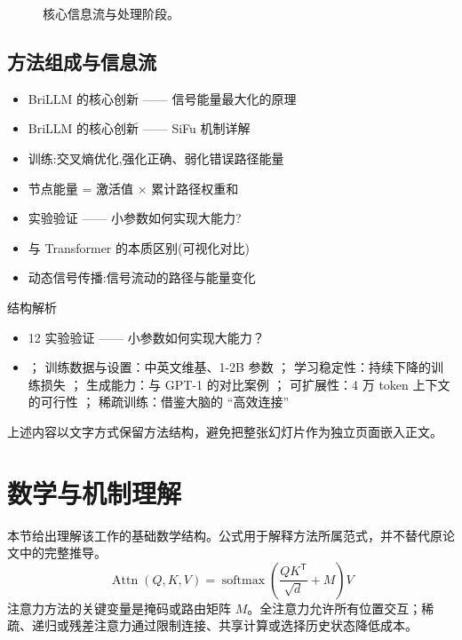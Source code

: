 \documentclass[UTF8,11pt,a4paper]{ctexart}
\begin{document}
\begin{figure}[H]
\centering
{}
\caption{核心信息流与处理阶段。}
\end{figure}

\subsection{方法组成与信息流}
\begin{itemize}
\item BriLLM 的核心创新 —— 信号能量最大化的原理
\item BriLLM 的核心创新 —— SiFu 机制详解
\item 训练:交叉熵优化,强化正确、弱化错误路径能量
\item 节点能量 = 激活值 × 累计路径权重和
\item 实验验证 —— 小参数如何实现大能力?
\item 与 Transformer 的本质区别(可视化对比)
\item 动态信号传播:信号流动的路径与能量变化
\end{itemize}

\begin{keybox}{结构解析}
\begin{itemize}
\item 12 实验验证 —— 小参数如何实现大能力？
\item ； 训练数据与设置：中英文维基、1-2B 参数 ； 学习稳定性：持续下降的训练损失 ； 生成能力：与 GPT-1 的对比案例 ； 可扩展性：4 万 token 上下文的可行性 ； 稀疏训练：借鉴大脑的 “高效连接”
\end{itemize}
\end{keybox}

上述内容以文字方式保留方法结构，避免把整张幻灯片作为独立页面嵌入正文。

\section{数学与机制理解}
本节给出理解该工作的基础数学结构。公式用于解释方法所属范式，并不替代原论文中的完整推导。
\begin{equation}
\operatorname{Attn}(Q,K,V)=\operatorname{softmax}\!\left(\frac{QK^{\mathsf T}}{\sqrt d}+M\right)V
\end{equation}
注意力方法的关键变量是掩码或路由矩阵 $M$。全注意力允许所有位置交互；稀疏、递归或残差注意力通过限制连接、共享计算或选择历史状态降低成本。
\end{document}
